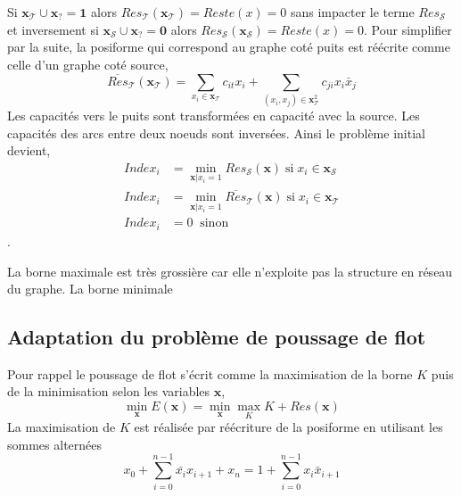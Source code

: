 \documentclass[../main/These_Mathias_Paget.tex]{subfiles}
\begin{document}
Si $\boldsymbol{x}_\mathcal{T} \cup \boldsymbol{x}_\mathcal{?}=\boldsymbol{1}$ alors $Res_\mathcal{T}(\boldsymbol{x}_\mathcal{T})=Reste(x)=0$ sans impacter le terme $Res_\mathcal{S}$ et inversement si $\boldsymbol{x}_\mathcal{S} \cup \boldsymbol{x}_\mathcal{?}=\boldsymbol{0}$ alors $Res_\mathcal{S}(\boldsymbol{x}_\mathcal{S})=Reste(x)=0$.
Pour simplifier par la suite, la posiforme qui correspond au graphe coté puits est réécrite comme celle d'un graphe coté source,
\begin{equation}
\overline{Res}_\mathcal{T}(\boldsymbol{x}_\mathcal{T}) = \sum_{x_i \in \boldsymbol{x}_\mathcal{T}}{c_{it}x_i} + \sum_{(x_i,x_j) \in \boldsymbol{x}^{2}_\mathcal{T}}{ c_{ji}x_i\bar{x}_j}
\end{equation}
Les capacités vers le puits sont transformées en capacité avec la source. Les capacités des arcs entre deux noeuds sont inversées. Ainsi le problème initial devient,
\begin{equation}
\begin{aligned}
Index_i &= \min_{\boldsymbol{x} | x_i=1}{Res_\mathcal{S}(\boldsymbol{x})} \; \text{si} \; x_i \in \boldsymbol{x}_\mathcal{S} \\
Index_i &= \min_{\boldsymbol{x} | x_i=1}{\overline{Res}_\mathcal{T}(\boldsymbol{x}) \; \text{si} \; x_i \in \boldsymbol{x}_\mathcal{T}} \\
Index_i &= 0 \;\; \text{sinon}
\end{aligned}
\end{equation}.

La borne maximale est très grossière car elle n'exploite pas la structure en réseau du graphe. La borne minimale 




\subsection{Adaptation du problème de poussage de flot}

Pour rappel le poussage de flot s'écrit comme la maximisation de la borne $K$ puis de la minimisation selon les variables $\boldsymbol{x}$,
\begin{equation}
			\min_{\boldsymbol{x}} E(\boldsymbol{x})=\min_{\boldsymbol{x}} \max_{K}{K + Res(\boldsymbol{x})}
\end{equation}
La maximisation de $K$ est réalisée par réécriture de la posiforme en utilisant les sommes alternées
\begin{equation}
			x_0 + \sum_{i=0}^{n-1} \bar{x_i}x_{i+1} + x_n = 1 + \sum_{i=0}^{n-1} x_i\bar{x}_{i+1} 
\end{equation}
\end{document}
